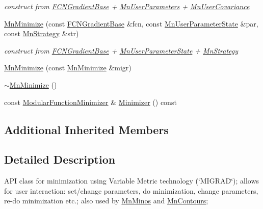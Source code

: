 \begin{DoxyCompactItemize}
\begin{DoxyCompactList}\small\item\em construct from \mbox{\hyperlink{classROOT_1_1Minuit2_1_1FCNGradientBase}{F\+C\+N\+Gradient\+Base}} + \mbox{\hyperlink{classROOT_1_1Minuit2_1_1MnUserParameters}{Mn\+User\+Parameters}} + \mbox{\hyperlink{classROOT_1_1Minuit2_1_1MnUserCovariance}{Mn\+User\+Covariance}} \end{DoxyCompactList}\item 
\mbox{\hyperlink{classROOT_1_1Minuit2_1_1MnMinimize_ae607cd588cff70b64c0705bb86a36ba0}{Mn\+Minimize}} (const \mbox{\hyperlink{classROOT_1_1Minuit2_1_1FCNGradientBase}{F\+C\+N\+Gradient\+Base}} \&fcn, const \mbox{\hyperlink{classROOT_1_1Minuit2_1_1MnUserParameterState}{Mn\+User\+Parameter\+State}} \&par, const \mbox{\hyperlink{classROOT_1_1Minuit2_1_1MnStrategy}{Mn\+Strategy}} \&str)
\begin{DoxyCompactList}\small\item\em construct from \mbox{\hyperlink{classROOT_1_1Minuit2_1_1FCNGradientBase}{F\+C\+N\+Gradient\+Base}} + \mbox{\hyperlink{classROOT_1_1Minuit2_1_1MnUserParameterState}{Mn\+User\+Parameter\+State}} + \mbox{\hyperlink{classROOT_1_1Minuit2_1_1MnStrategy}{Mn\+Strategy}} \end{DoxyCompactList}\item 
\mbox{\hyperlink{classROOT_1_1Minuit2_1_1MnMinimize_a5381e16cfd79c2b4da61e399a6a02b35}{Mn\+Minimize}} (const \mbox{\hyperlink{classROOT_1_1Minuit2_1_1MnMinimize}{Mn\+Minimize}} \&migr)
\item 
\mbox{\hyperlink{classROOT_1_1Minuit2_1_1MnMinimize_ae4544af29d79b1415179ce48c05b9ae0}{$\sim$\+Mn\+Minimize}} ()
\item 
const \mbox{\hyperlink{classROOT_1_1Minuit2_1_1ModularFunctionMinimizer}{Modular\+Function\+Minimizer}} \& \mbox{\hyperlink{classROOT_1_1Minuit2_1_1MnMinimize_a879bb789f98c72f9a90a327fc7bb48fd}{Minimizer}} () const
\end{DoxyCompactItemize}
\subsection*{Additional Inherited Members}


\subsection{Detailed Description}
A\+PI class for minimization using Variable Metric technology (\char`\"{}\+M\+I\+G\+R\+A\+D\char`\"{}); allows for user interaction\+: set/change parameters, do minimization, change parameters, re-\/do minimization etc.; also used by \mbox{\hyperlink{classROOT_1_1Minuit2_1_1MnMinos}{Mn\+Minos}} and \mbox{\hyperlink{classROOT_1_1Minuit2_1_1MnContours}{Mn\+Contours}}; 

